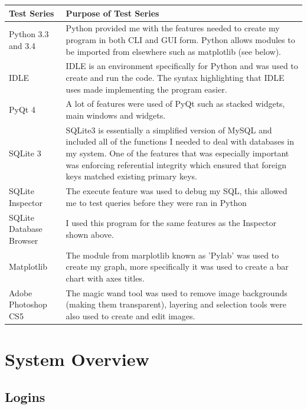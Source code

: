 \begin{center}
    \begin{tabular}{|p{4cm}|p{6cm}|}
        \hline
        \textbf{Test Series} & \textbf{Purpose of Test Series} \\ \hline
        Python 3.3 and 3.4 & Python provided me with the features needed to create my program in both CLI and GUI form. Python allows modules to be imported from elsewhere such as matplotlib (see below).  \\ \hline
        IDLE & IDLE is an environment specifically for Python and was used to create and run the code. The syntax highlighting that IDLE uses made implementing the program easier. \\ \hline
        PyQt 4 & A lot of features were used of PyQt such as stacked widgets, main windows and widgets. \\ \hline
        SQLite 3 & SQLite3 is essentially a simplified version of MySQL and included all of the functions I needed to deal with databases in my system. One of the features that was especially important was enforcing referential integrity which ensured that foreign keys matched existing primary keys.  \\ \hline
        SQLite Inspector & The execute feature was used to debug my SQL, this allowed me to test queries before they were ran in Python  \\ \hline
        SQLite Database Browser & I used this program for the same features as the Inspector shown above.   \\ \hline
        Matplotlib & The module from marplotlib known as 'Pylab' was used to create my graph, more specifically it was used to create a bar chart with axes titles.  \\ \hline
        Adobe Photoshop CS5 & The magic wand tool was used to remove image backgrounds (making them transparent), layering and selection tools were also used to create and edit images. \\ \hline
    \end{tabular}
\end{center}

\section{System Overview}

\subsection{Logins}

